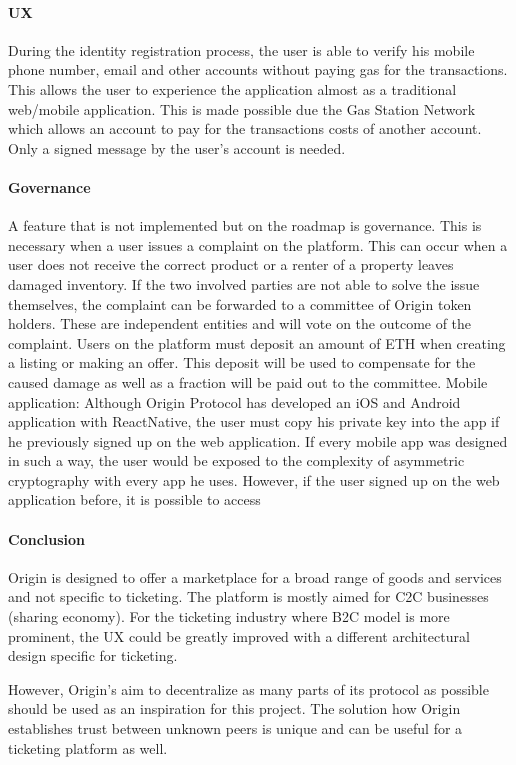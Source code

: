 \paragraph{UX}
During the identity registration process, the user is able to verify his mobile phone number, email and other accounts without paying gas for the transactions. This allows the user to experience the application almost as a traditional web/mobile application. This is made possible due the Gas Station Network which allows an account to pay for the transactions costs of another account. Only a signed message by the user’s account is needed. 

\paragraph{Governance}
A feature that is not implemented but on the roadmap is governance. This is necessary when a user issues a complaint on the platform. This can occur when a user does not receive the correct product or a renter of a property leaves damaged inventory. If the two involved parties are not able to solve the issue themselves, the complaint can be forwarded to a committee of Origin token holders. These are independent entities and will vote on the outcome of the complaint. Users on the platform must deposit an amount of ETH when creating a listing or making an offer. This deposit will be used to compensate for the caused damage as well as a fraction will be paid out to the committee.
Mobile application: Although Origin Protocol has developed an iOS and Android application with ReactNative, the user must copy his private key into the app if he previously signed up on the web application. If every mobile app was designed in such a way, the user would be exposed to the complexity of asymmetric cryptography with every app he uses. However, if the user signed up on the web application before, it is possible to access 

\paragraph{Conclusion}
Origin is designed to offer a marketplace for a broad range of goods and services and not specific to ticketing. The platform is mostly aimed for C2C businesses (sharing economy). For the ticketing industry where B2C model is more prominent, the UX could be greatly improved with a different architectural design specific for ticketing.

However, Origin's aim to decentralize as many parts of its protocol as possible should be used as an inspiration for this project. The solution how Origin establishes trust between unknown peers is unique and can be useful for a ticketing platform as well. 

